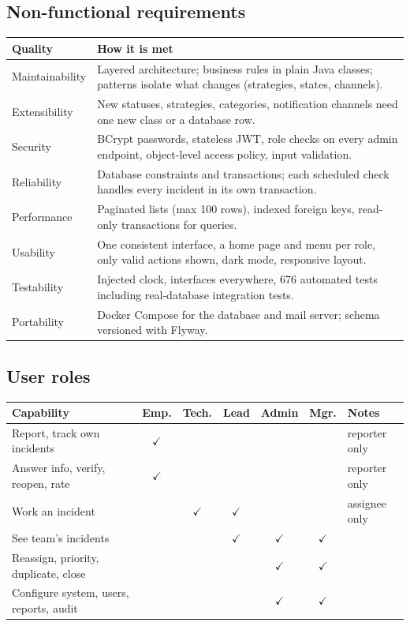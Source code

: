 \documentclass[11pt,a4paper]{article}
\newcommand{\yes}{\textcolor{accent}{$\checkmark$}}
\begin{document}
\subsection{Non-functional requirements}
\begin{tabularx}{\linewidth}{@{}lX@{}}
\toprule
\textbf{Quality} & \textbf{How it is met} \\ \midrule
Maintainability & Layered architecture; business rules in plain Java classes; patterns isolate what changes (strategies, states, channels). \\
Extensibility & New statuses, strategies, categories, notification channels need one new class or a database row. \\
Security & BCrypt passwords, stateless JWT, role checks on every admin endpoint, object-level access policy, input validation. \\
Reliability & Database constraints and transactions; each scheduled check handles every incident in its own transaction. \\
Performance & Paginated lists (max 100 rows), indexed foreign keys, read-only transactions for queries. \\
Usability & One consistent interface, a home page and menu per role, only valid actions shown, dark mode, responsive layout. \\
Testability & Injected clock, interfaces everywhere, 676 automated tests including real-database integration tests. \\
Portability & Docker Compose for the database and mail server; schema versioned with Flyway. \\ \bottomrule
\end{tabularx}

\subsection{User roles}
\begin{tabularx}{\linewidth}{@{}l c c c c c X@{}}
\toprule
\textbf{Capability} & \textbf{Emp.} & \textbf{Tech.} & \textbf{Lead} & \textbf{Admin} & \textbf{Mgr.} & \textbf{Notes} \\ \midrule
Report, track own incidents & \yes & & & & & reporter only \\
Answer info, verify, reopen, rate & \yes & & & & & reporter only \\
Work an incident & & \yes & \yes & & & assignee only \\
See team's incidents & & & \yes & \yes & \yes & \\
Reassign, priority, duplicate, close & & & & \yes & \yes & \\
Configure system, users, reports, audit & & & & \yes & \yes & \\ \bottomrule
\end{tabularx}
\end{document}
